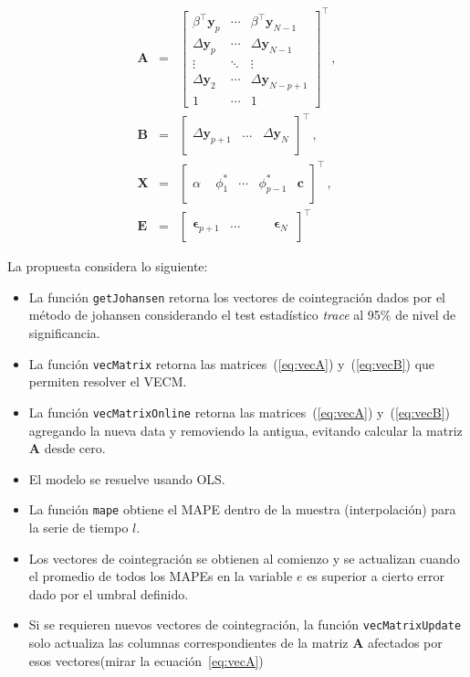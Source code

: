\begin{eqnarray}\label{eq:vecmatrix}
 \mathbf{A}&=&
   \begin{bmatrix} 
   \beta^\top \mathbf{y}_{p} & 
   \cdots & \beta^\top \mathbf{y}_{N-1} \\
   \Delta \mathbf{y}_p  & \cdots 
   &\Delta\mathbf{y}_{N-1} \\ 
   \vdots  & \ddots & \vdots \\
   \Delta\mathbf{y}_2  & \cdots 
   & \Delta \mathbf{y}_{N-p+1} \\
   1 & \cdots & 1 
   \end{bmatrix}^\top \label{eq:vecA} \, ,\\
\mathbf{B} & = &
 \begin{bmatrix}
 \quad\\
  \Delta \mathbf{y}_{p+1} & 
  \dots &
  \Delta \mathbf{y}_N \label{eq:vecB}\\
  \quad
 \end{bmatrix}^\top \, ,\\
\mathbf{X}&=&
  \begin{bmatrix}
   \quad \\
   \alpha & \phi_1^* & \cdots & \phi_{p-1}^* & \mathbf{c} \\  
   \quad
   \end{bmatrix}^\top \, ,\\
\mathbf{E} &=&
\begin{bmatrix}
   \quad \\
   \mathbf{\epsilon}_{p+1} &
   \dots &
   \quad &\mathbf{\epsilon}_N \, \\ \quad
\end{bmatrix}^\top 
\end{eqnarray}

La propuesta considera lo siguiente:
\begin{itemize}
 \item La función \texttt{getJohansen} retorna los vectores de cointegración
dados por el método de johansen considerando el test estadístico \emph{trace}
al 95\% de nivel de significancia.
 \item La función \texttt{vecMatrix} retorna las matrices~(\ref{eq:vecA})
y~(\ref{eq:vecB}) que permiten resolver el VECM.
 \item La función \texttt{vecMatrixOnline} retorna las matrices~(\ref{eq:vecA})
y~(\ref{eq:vecB}) agregando la nueva data y removiendo la antigua, evitando
calcular la matriz $\mathbf{A}$ desde cero.
 \item El modelo se resuelve usando OLS.
 \item La función \texttt{mape} obtiene el MAPE dentro de la muestra
(interpolación) para la serie de tiempo $l$.
 \item Los vectores de cointegración se obtienen al comienzo y se actualizan
cuando el promedio de todos los MAPEs en la variable $e$ es superior a cierto
error dado por el umbral definido.
 \item Si se requieren nuevos vectores de cointegración, la función
\texttt{vecMatrixUpdate} solo actualiza las columnas correspondientes de la
matriz $\mathbf{A}$ afectados por esos vectores(mirar la
ecuación~\ref{eq:vecA})
\end{itemize}

